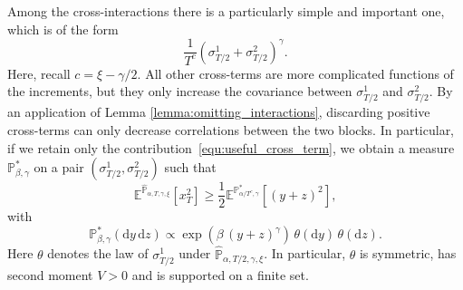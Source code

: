 \documentclass[reqno,11pt]{amsart}
\newcommand{\1}{\mathds{1}}
\theoremstyle{plain}
\theoremstyle{definition}
\numberwithin{equation}{section}
\newcommand{\bbE}{{\mathbb E}}
\newcommand{\bbP}{{\mathbb P}}
\newcommand{\de}{{\mathrm{d}}}
\begin{document}
Among the cross-interactions there is a particularly simple and important one,
which is of the form
\begin{equation}
    \label{equ:useful_cross_term}
    \frac{1}{T^c}(\sigma^1 _{T/2} + \sigma^2 _{T/2})^\gamma.
\end{equation}
Here, recall $c = \xi-\gamma/2$.
All other cross-terms are more complicated functions of the increments, but
they only increase the covariance between $\sigma^1 _{T/2}$ and $\sigma^2 _{T/2}$.
By an application of Lemma \ref{lemma:omitting_interactions}, discarding positive cross-terms can only decrease
correlations between the two blocks. In particular, if we retain only the
contribution~\eqref{equ:useful_cross_term}, we obtain a measure
\(\bbP^* _{\beta,\gamma}\) on a pair \((\sigma^1 _{T/2},\sigma^2 _{T/2})\) such that
$$\bbE^{\hat{\bbP}_{\alpha,T,\gamma,\xi}}[x_T ^2]
\ge
\frac 1 2\bbE^{\bbP^*_{\alpha/T^c,\gamma}}[ (y+z) ^2],$$
with
\begin{equation}
    \label{eq:two-block-measure}
    \bbP^* _{\beta,\gamma}(\de y \,\de z)
    \propto
    \exp\!\left(
        \beta\,(y+z)^\gamma
    \right)
    \,\theta(\de y)\,\theta(\de z).
\end{equation}
Here \(\theta\) denotes the law of \(\sigma^1 _{T/2}\) under
\(\hat{\bbP}_{\alpha,T/2,\gamma,\xi}\). In particular, \(\theta\) is symmetric, has second moment $V>0$ and is supported on a finite set.
\end{document}
